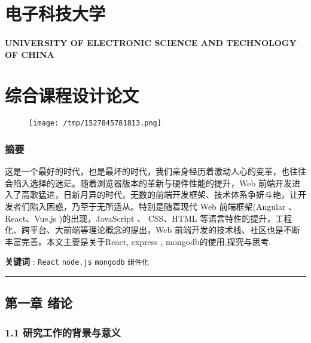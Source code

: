 \documentclass[]{article}
\date{}
\let\oldparagraph\paragraph
\renewcommand{\paragraph}[1]{\oldparagraph{#1}\mbox{}}
\begin{document}
\hypertarget{header-n5}{%
\section{\texorpdfstring{\textbf{电子科技大学}}{电子科技大学}}\label{header-n5}}

\hypertarget{header-n6}{%
\paragraph{UNIVERSITY OF ELECTRONIC SCIENCE AND TECHNOLOGY OF
CHINA}\label{header-n6}}

\hypertarget{header-n7}{%
\section{综合课程设计论文}\label{header-n7}}

\begin{figure}
\centering
\texttt{[image: /tmp/1527845781813.png]}
\caption{}
\end{figure}

\hypertarget{header-n32}{%
\subsubsection{摘要}\label{header-n32}}

这是一个最好的时代，也是最坏的时代，我们亲身经历着激动人心的变革，也往往会陷入选择的迷茫。随着浏览器版本的革新与硬件性能的提升，Web
前端开发进入了高歌猛进，日新月异的时代，无数的前端开发框架、技术体系争妍斗艳，让开发者们陷入困惑，乃至于无所适从。特别是随着现代
Web 前端框架(Angular 、 React、Vue.js )的出现，JavaScript 、 CSS、HTML
等语言特性的提升，工程化、跨平台、大前端等理论概念的提出，Web
前端开发的技术栈、社区也是不断丰富完善。本文主要是关于React, express ,
mongodb的使用,探究与思考.

\textbf{关键词} : \texttt{React} \texttt{node.js} \texttt{mongodb}
\texttt{组件化}

\begin{center}\rule{0.5\linewidth}{\linethickness}\end{center}

\hypertarget{header-n38}{%
\subsection{第一章 绪论}\label{header-n38}}

\hypertarget{header-n39}{%
\subsubsection{1.1 研究工作的背景与意义}\label{header-n39}}
\end{document}
